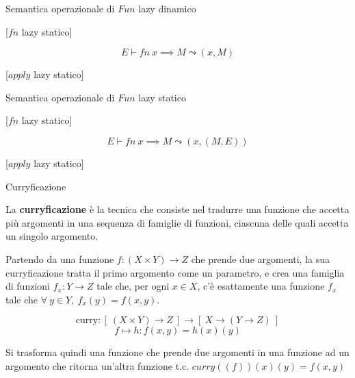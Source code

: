 \documentclass[a4paper,11pt]{report}
\begin{document}
\begin{defbox}{Semantica operazionale di \( Fun \) lazy dinamico}{}

    \begin{center}
        [\( fn \) lazy statico]
    \end{center}
    \vspace{-1em}
    \[ E \vdash fn \ x \implies M \leadsto (x, M) \]


    \begin{center}
        [\( apply \) lazy statico]
    \end{center}
    \vspace{-2em}
    \begin{prooftree}
    \end{prooftree}
\end{defbox}
\begin{defbox}{Semantica operazionale di \( Fun \) lazy statico}{}

    \begin{center}
        [\( fn \) lazy statico]
    \end{center}
    \vspace{-1em}
    \[ E \vdash fn \ x \implies M \leadsto (x, (M, E)) \]


    \begin{center}
        [\( apply \) lazy statico]
    \end{center}
    \vspace{-2em}
    \begin{prooftree}
    \end{prooftree}
\end{defbox}

\begin{defbox}{Curryficazione}{}

    La \textbf{curryficazione} è la tecnica che consiste nel tradurre una funzione che accetta più argomenti in una sequenza di famiglie di funzioni, ciascuna delle quali accetta un singolo argomento.


    Partendo da una funzione \( f: (X \times Y) \to Z\) che prende due argomenti, la sua curryficazione tratta il primo argomento come un parametro, e crea una famiglia di funzioni \( f_x : Y \to Z \) tale che, per ogni \( x \in X  \), c'è esattamente una funzione \( f_x \) tale che \( \forall \ y \in Y , \  f_x(y)=f(x,y)\).

    \[ \text{curry}: [ \ (X \times Y) \to Z \ ] \to [ \ X \to (Y \to Z) \ ]\]
    \[ f \mapsto h : f(x, y) = h(x)(y) \]


Si trasforma quindi una funzione che prende due argomenti in una funzione ad un argomento che ritorna un'altra funzione t.c. \( curry((f))(x)(y) = f(x, y) \)

\end{defbox}
\end{document}
